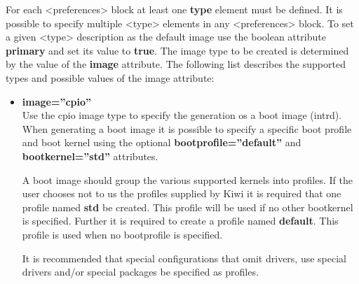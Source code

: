For each <preferences> block at least one \textbf{type} element must be
defined. It is possible to specify multiple <type> elements in any 
<preferences> block. To set a given <type> description as the default image
use the boolean attribute \textbf{primary} and set its value to \textbf{true}.
The image type to be created is determined by the value of the \textbf{image}
attribute. The following list describes the supported types and possible
values of the image attribute:

\begin{itemize}
\item \textbf{image=''cpio''}\\
      Use the cpio image type to specify the generation os a boot image
      (intrd). When generating a boot image it is possible to specify a
      specific boot profile and boot kernel using the optional
      \textbf{bootprofile=''default''} and \textbf{bootkernel=''std''}
      attributes.
      
      A boot image should group the various supported kernels into profiles. 
      If the user chooses not to us the profiles supplied by Kiwi it is
      required that one profile named \textbf{std} be created. This profile
      will be used if no other bootkernel is specified. Further it is 
      required to create a  profile named \textbf{default}. This profile is
      used when no bootprofile is specified.

      It is recommended that special configurations that omit drivers, use
      special drivers and/or special packages be specified as profiles.



\end{itemize}
